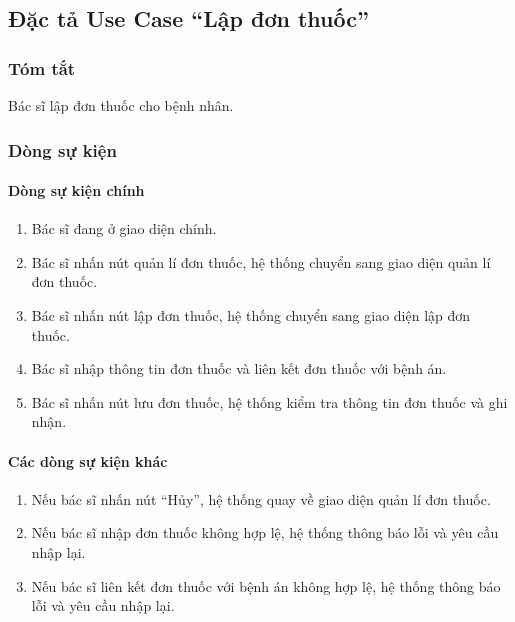 \subsection{Đặc tả Use Case ``Lập đơn thuốc''}

\subsubsection{Tóm tắt}
Bác sĩ lập đơn thuốc cho bệnh nhân.

\subsubsection{Dòng sự kiện}
\paragraph{\textbf{Dòng sự kiện chính}}
\begin{enumerate}
  \item Bác sĩ đang ở giao diện chính.
  \item Bác sĩ nhấn nút quản lí đơn thuốc, hệ thống chuyển sang giao diện quản lí đơn thuốc.
  \item Bác sĩ nhấn nút lập đơn thuốc, hệ thống chuyển sang giao diện lập đơn thuốc.
  \item Bác sĩ nhập thông tin đơn thuốc và liên kết đơn thuốc với bệnh án.
  \item Bác sĩ nhấn nút lưu đơn thuốc, hệ thống kiểm tra thông tin đơn thuốc và ghi nhận.
\end{enumerate}

\paragraph{\textbf{Các dòng sự kiện khác}}
\begin{enumerate}
  \item Nếu bác sĩ nhấn nút ``Hủy'', hệ thống quay về giao diện quản lí đơn thuốc.
  \item Nếu bác sĩ nhập đơn thuốc không hợp lệ, hệ thống thông báo lỗi và yêu cầu nhập lại.
  \item Nếu bác sĩ liên kết đơn thuốc với bệnh án không hợp lệ, hệ thống thông báo lỗi và yêu cầu nhập lại.
\end{enumerate}

